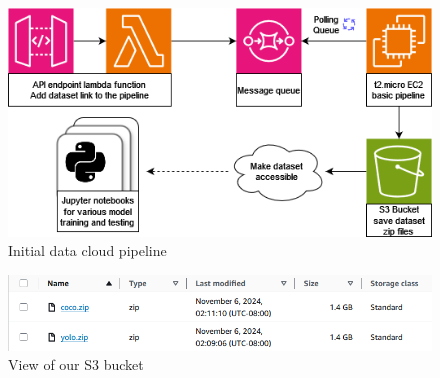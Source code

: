 \documentclass[stu,12pt,floatsintext]{apa7}
\begin{document}
\begin{figure}[!htb]
    \centering
    \includegraphics[width=0.5\linewidth]{images/AWS_diagram.png}
    \caption{Initial data cloud pipeline}
    \label{fig:aws-pipeline}
\end{figure}

\begin{figure}[!htb]
    \centering
    \includegraphics[width=0.75\linewidth]{images/s3_bucket.png}
    \caption{View of our S3 bucket}
    \label{fig:s3}
\end{figure}

\printbibliography

\appendix
\end{document}
